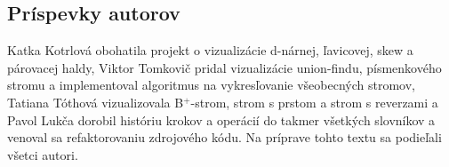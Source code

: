 \subsection{Príspevky autorov}
Katka Kotrlová obohatila projekt o vizualizácie d-nárnej, ľavicovej, skew a 
párovacej haldy, Viktor Tomkovič pridal vizualizácie union-findu, písmenkového 
stromu a implementoval algoritmus na vykresľovanie všeobecných stromov, 
Tatiana Tóthová vizualizovala B$^+$-strom, strom s prstom a strom s reverzami 
a Pavol Lukča dorobil históriu krokov a operácií do takmer všetkých slovníkov 
a venoval sa refaktorovaniu zdrojového kódu. Na príprave tohto textu sa 
podieľali všetci autori.

